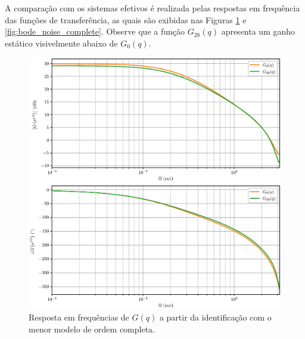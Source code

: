 \documentclass{ppgeesa}
\begin{document}
A comparação com os sistemas efetivos é realizada pelas respostas em frequência das funções de transferência, as quais são exibidas nas Figuras \ref{fig:bode_system_complete} e \ref{fig:bode_noise_complete}.
Observe que a função $G_{28}(q)$ apresenta um ganho estático visivelmente abaixo de $G_0(q)$.
\begin{figure}[!htbp]
  \centering
  \includegraphics[width=\linewidth]{bode_G_28}
  \caption{Resposta em frequências de $G(q)$ a partir da identificação com o menor modelo de ordem completa.}
  \label{fig:bode_system_complete}
\end{figure}
\end{document}

